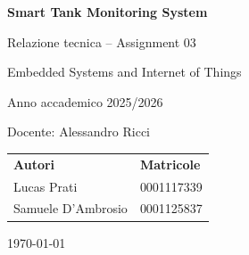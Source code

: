 \begin{titlepage}
    \centering
    \vspace*{2cm}
    {\Huge\bfseries Smart Tank Monitoring System\par}
    \vspace{0.8cm}
    {\Large Relazione tecnica -- Assignment 03\par}
    \vspace{0.8cm}
    {\large Embedded Systems and Internet of Things\par}
    {\large Anno accademico 2025/2026\par}
    \vfill
    {\large Docente: Alessandro Ricci\par}
    \vspace{1cm}
    \begin{tabular}{ll}
        \textbf{Autori} & \textbf{Matricole} \\
        Lucas Prati & 0001117339 \\
        Samuele D'Ambrosio & 0001125837
    \end{tabular}\par
    \vfill
    {\today\par}
\end{titlepage}
 